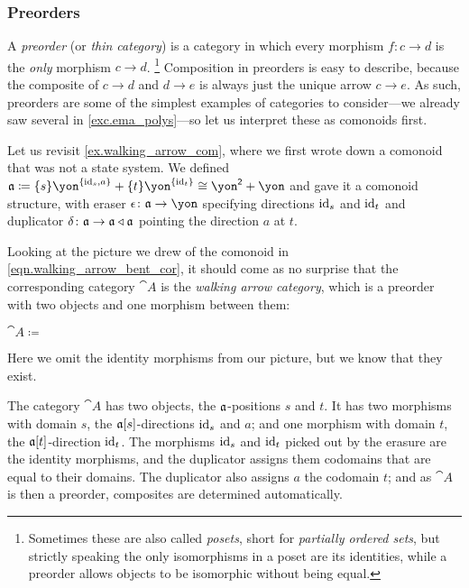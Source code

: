 \documentclass[Book-Poly]{subfiles}
\begin{document}
\subsubsection{Preorders}

A \emph{preorder} (or \emph{thin category}) is a category in which every morphism $f\colon c\to d$ is the \emph{only} morphism $c\to d$.%
\footnote{Sometimes these are also called \emph{posets}, short for \emph{partially ordered sets}, but strictly speaking the only isomorphisms in a poset are its identities, while a preorder allows objects to be isomorphic without being equal.}
Composition in preorders is easy to describe, because the composite of $c\to d$ and $d\to e$ is always just the unique arrow $c\to e$.
As such, preorders are some of the simplest examples of categories to consider---we already saw several in \cref{exc.ema_polys}---so let us interpret these as comonoids first.

\begin{example}\label{ex.walking_arrow_cat}
Let us revisit \cref{ex.walking_arrow_com}, where we first wrote down a comonoid that was not a state system.
We defined $\car{a}\coloneqq\{s\}\yon^{\{\id_s,a\}}+\{t\}\yon^{\{\id_t\}}\iso\yon^\2+\yon$ and gave it a comonoid structure, with eraser $\epsilon\colon\car{a}\to\yon$ specifying directions $\mathrm{id}_s$ and $\mathrm{id}_t$ and duplicator $\delta\colon\mathfrak{a}\to\mathfrak{a}\mathbin{\triangleleft}\mathfrak{a}$ pointing the direction $a$ at $t$.

Looking at the picture we drew of the comonoid in \eqref{eqn.walking_arrow_bent_cor}, it should come as no surprise that the corresponding category $\cat{A}$ is the \emph{walking arrow category}, which is a preorder with two objects and one morphism between them:
\begin{center}
    $\cat{A}\coloneqq\:$
\end{center}
Here we omit the identity morphisms from our picture, but we know that they exist.

The category $\cat{A}$ has two objects, the $\mathfrak{a}$-positions $s$ and $t$.
It has two morphisms with domain $s$, the $\mathfrak{a}[s]$-directions $\mathrm{id}_s$ and $a$; and one morphism with domain $t$, the $\mathfrak{a}[t]$-direction $\mathrm{id}_t$.
The morphisms $\mathrm{id}_s$ and $\mathrm{id}_t$ picked out by the erasure are the identity morphisms, and the duplicator assigns them codomains that are equal to their domains.
The duplicator also assigns $a$ the codomain $t$; and as $\cat{A}$ is then a preorder, composites are determined automatically.
\end{example}
\end{document}
